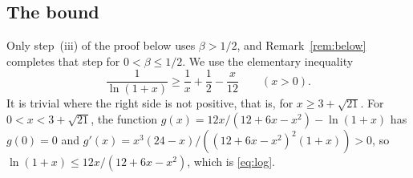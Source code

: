 \documentclass[11pt]{article}
\theoremstyle{definition}
\begin{document}
\subsection{The bound}\label{sec:bound}

Only step~(iii) of the proof below uses $\beta > 1/2$, and Remark~\ref{rem:below} completes that step for $0 < \beta \le 1/2$. We use the elementary inequality
\begin{equation}\label{eq:log}
\frac{1}{\ln(1 + x)} \ge \frac1x + \frac12 - \frac{x}{12} \qquad (x > 0).
\end{equation}
It is trivial where the right side is not positive, that is, for $x \ge 3 + \sqrt{21}$. For $0 < x < 3 + \sqrt{21}$, the function $g(x) = 12x/(12 + 6x - x^2) - \ln(1 + x)$ has $g(0) = 0$ and $g'(x) = x^3(24 - x)/((12 + 6x - x^2)^2(1 + x)) > 0$, so $\ln(1 + x) \le 12x/(12 + 6x - x^2)$, which is \eqref{eq:log}.
\end{document}
